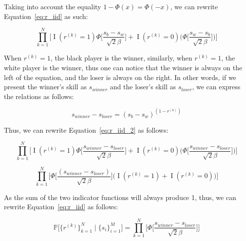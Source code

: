 \documentclass[a4paper,11pt]{article}
\theoremstyle{mytheor}
\begin{document}
Taking into account the equality $1-\Phi(x)=\Phi(-x)$, we can rewrite Equation~\ref{eq:r_iid} as such:

\begin{equation}
    \label{eq:r_iid_2}
    \prod_{k=1}^{N}\Big[
    \mathop{I}(r^{(k)}=1)\Phi\Big[ \frac{s_b-s_w}{\sqrt{2}\beta} \Big] + 
    \mathop{I}(r^{(k)}=0)\Big(\Phi\Big[ \frac{s_w-s_b}{\sqrt{2}\beta} \Big] \Big)
    \Big]
\end{equation}

When $r^{(k)}=1$, the black player is the winner, similarly, when $r^{(k)}=1$, the white player is the winner, thus one can notice that the winner is always on the left of the equation, and the loser is always on the right. In other words, if we present the winner's skill as $s_{winner}$ and the loser's skill as $s_{loser}$, we can express the relations as follows:

\begin{equation}
    \label{eq:winner_loser}
    s_{winner}-s_{loser} = (s_b-s_w)^{(1-r^{(k)})}
\end{equation}

Thus, we can rewrite Equation~\ref{eq:r_iid_2} as follows:

\begin{equation}
    \label{eq:r_iid_3}
    \prod_{k=1}^{N}\Big[
    \mathop{I}(r^{(k)}=1)\Phi\Big[ \frac{s_{winner}-s_{loser}}{\sqrt{2}\beta} \Big] + 
    \mathop{I}(r^{(k)}=0)\Big(\Phi\Big[ \frac{s_{winner}-s_{loser}}{\sqrt{2}\beta} \Big] \Big)
    \Big]
\end{equation}

\begin{equation}
    \label{eq:r_iid_4}
    \prod_{k=1}^{N}\Big[
        \Phi\Big[ \frac{(s_{winner}-s_{loser})}{\sqrt{2}\beta} \Big]
        \Big(\mathop{I}(r^{(k)}=1) + \mathop{I}(r^{(k)}=0)\Big)
    \Big]
\end{equation}

As the sum of the two indicator functions will always produce 1, thus, we can rewrite Equation~\ref{eq:r_iid} as follows:

\begin{equation}
    \label{eq:r_iid_5}
    \mathbb{P} \Big[ \{r^{(k)}\}_{k=1}^{N}  \mid \{s_i\}_{i=1}^{M} \Big] = 
    \prod_{k=1}^{N}\Big[
        \Phi\Big[ \frac{s_{winner}-s_{loser}}{\sqrt{2}\beta} \Big]
    \Big]
\end{equation}
\end{document}
